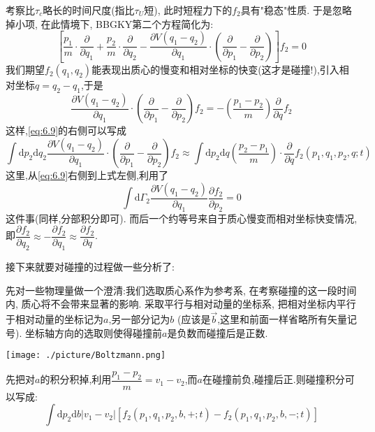     考察比$\tau_{c}$略长的时间尺度(指比$\tau_{U}$短), 此时短程力下的$f_2$具有"稳态"性质. 于是忽略掉小项, 在此情境下, BBGKY第二个方程简化为:
    \begin{equation}
      \left[ \frac{p_1}{m} \cdot \dfrac{\partial }{\partial q_1} + \frac{p_2}{m} \cdot \dfrac{\partial }{\partial q_2}- \dfrac{\partial V(q_1-q_2)}{\partial q_1}\cdot \left( \dfrac{\partial }{\partial p_1}-\dfrac{\partial }{\partial p_2} \right)  \right] f_2=0
    \end{equation}
    我们期望$f_2(q_1,q_2)$能表现出质心的慢变和相对坐标的快变(这才是碰撞!),引入相对坐标$q=q_2-q_1$,于是 
    \begin{equation}
      \dfrac{\partial V(q_1-q_2)}{\partial q_1}\cdot \left( \dfrac{\partial }{\partial p_1}-\dfrac{\partial }{\partial p_2} \right) f_2=-\left(\frac{p_1-p_2}{m}\right)\dfrac{\partial }{\partial q}f_2
    \end{equation}
    这样,\eqref{eq:6.9}的右侧可以写成
    \begin{equation}
      \int \mathrm{d} p_2 \mathrm{d} q_2 \dfrac{\partial V(q_1-q_2)}{\partial q_1} \cdot \left( \dfrac{\partial }{\partial p_1}-\dfrac{\partial }{\partial p_2} \right) f_2 \approx \int \mathrm{d} p_2 \mathrm{d} q \left( \frac{p_2-p_1}{m} \right) \cdot \dfrac{\partial }{\partial q}f_2(p_1,q_1,p_2,q;t)
    \end{equation}
    这里,从\eqref{eq:6.9}右侧到上式左侧,利用了
    \[\int \mathrm{d} \Gamma_2 \dfrac{\partial V(q_1-q_2)}{\partial q_1} \dfrac{\partial f_2}{\partial p_2}=0\]
    这件事(同样,分部积分即可). 而后一个约等号来自于质心慢变而相对坐标快变情况, 即$\dfrac{\partial f_2}{\partial q_2} \approx -\dfrac{\partial f_2}{\partial q_1} \approx \dfrac{\partial f_2}{\partial q}$.
    
    \vspace*{0.5cm}
        
    接下来就要对碰撞的过程做一些分析了:
    
    先对一些物理量做一个澄清:我们选取质心系作为参考系, 在考察碰撞的这一段时间内, 质心将不会带来显著的影响. 采取平行与相对动量的坐标系, 把相对坐标内平行于相对动量的坐标记为$a$,另一部分记为$b$ (应该是$\vec{b}$,这里和前面一样省略所有矢量记号). 坐标轴方向的选取则使得碰撞前$a$是负数而碰撞后是正数.
    \begin{center}
      \texttt{[image: ./picture/Boltzmann.png]}
    \end{center}
    
    先把对$a$的积分积掉,利用$\dfrac{p_1-p_2}{m}=v_1-v_2$,而$a$在碰撞前负,碰撞后正.则碰撞积分可以写成:
    \[\int \mathrm{d} p_2 \mathrm{d} b \left\vert v_1-v_2 \right\vert \left[ f_2(p_1,q_1,p_2,b,+;t)-f_2(p_1,q_1,p_2,b,-;t) \right] \]

